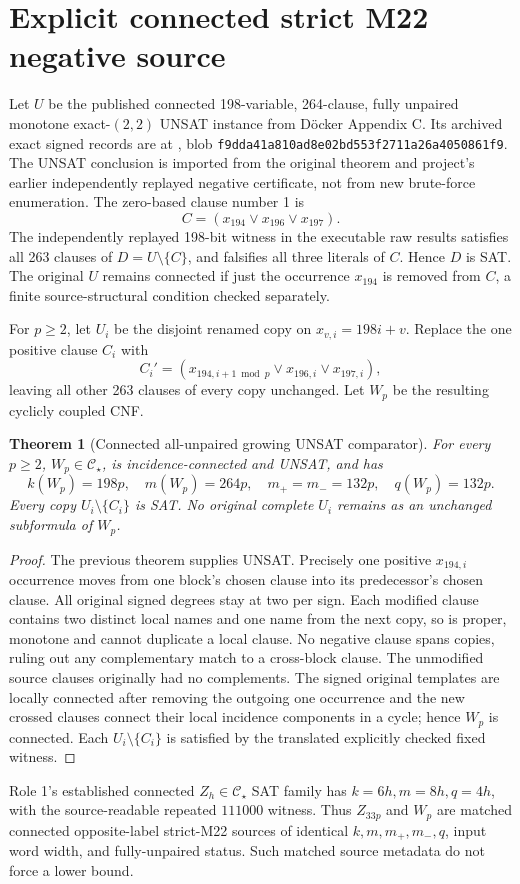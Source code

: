 \documentclass[11pt]{article}
\newtheorem{theorem}{Theorem}
\newcommand{\CS}{\mathcal C_\star}
\begin{document}
\section{Explicit connected strict M22 negative source}
Let \(U\) be the published connected 198-variable, 264-clause, fully unpaired monotone exact-$(2,2)$ UNSAT instance from D\"ocker Appendix C. Its archived exact signed records are at
, blob \texttt{f9dda41a810ad8e02bd553f2711a26a4050861f9}. The UNSAT conclusion is imported from the original theorem and project's earlier independently replayed negative certificate, not from new brute-force enumeration. The zero-based clause number 1 is
\[
C=(x_{194}\lor x_{196}\lor x_{197}).
\]
The independently replayed 198-bit witness in the executable raw results satisfies all 263 clauses of \(D=U\setminus\{C\}\), and falsifies all three literals of \(C\). Hence \(D\) is SAT. The original \(U\) remains connected if just the occurrence \(x_{194}\) is removed from \(C\), a finite source-structural condition checked separately.

For \(p\ge2\), let \(U_i\) be the disjoint renamed copy on \(x_{v,i}=198i+v\). Replace the one positive clause \(C_i\) with
\[
C_i'=(x_{194,i+1\bmod p}\lor x_{196,i}\lor x_{197,i}),
\]
leaving all other 263 clauses of every copy unchanged. Let \(W_p\) be the resulting cyclicly coupled CNF.

\begin{theorem}[Connected all-unpaired growing UNSAT comparator]
For every \(p\ge2\), \(W_p\in\CS\), is incidence-connected and UNSAT, and has
\[
\boxed{k(W_p)=198p,\quad m(W_p)=264p,\quad m_+=m_-=132p,\quad q(W_p)=132p.}
\]
Every copy \(U_i\setminus\{C_i\}\) is SAT. No original complete \(U_i\) remains as an unchanged subformula of \(W_p\).
\end{theorem}
\begin{proof}
The previous theorem supplies UNSAT. Precisely one positive \(x_{194,i}\) occurrence moves from one block's chosen clause into its predecessor's chosen clause. All original signed degrees stay at two per sign. Each modified clause contains two distinct local names and one name from the next copy, so is proper, monotone and cannot duplicate a local clause. No negative clause spans copies, ruling out any complementary match to a cross-block clause. The unmodified source clauses originally had no complements. The signed original templates are locally connected after removing the outgoing one occurrence and the new crossed clauses connect their local incidence components in a cycle; hence \(W_p\) is connected. Each \(U_i\setminus\{C_i\}\) is satisfied by the translated explicitly checked fixed witness.
\end{proof}
Role 1's established connected \(Z_h\in\CS\) SAT family has \(k=6h,m=8h,q=4h\), with the source-readable repeated \(111000\) witness. Thus \(Z_{33p}\) and \(W_p\) are matched connected opposite-label strict-M22 sources of identical \(k,m,m_+,m_-,q\), input word width, and fully-unpaired status. Such matched source metadata do not force a lower bound.
\end{document}
